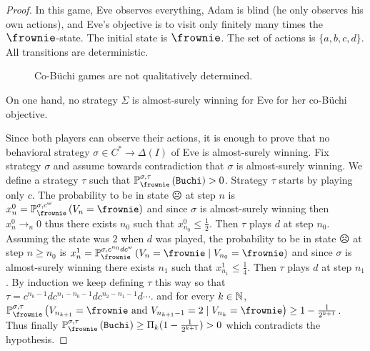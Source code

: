 \begin{proof}
In this game, Eve observes
everything, Adam is blind (he only observes his own actions),
and Eve's objective is to visit only finitely many times the ${\large \frownie}$-state. The initial state is $\large{\frownie}$. The set of actions is $\{a,b,c,d\}$.
All transitions are deterministic.%

\begin{figure}[h]
\begin{center}
\end{center}
\caption{Co-B{\"u}chi games are not qualitatively determined.}
\label{chap9fig4}
\end{figure} 


On one hand, no strategy $\Sigma$
is almost-surely winning for Eve
for her co-B{\"u}chi objective.
{
Since both players can observe their actions,
it is enough to prove that no behavioral
strategy
$\sigma\in C^*\to \Delta(I)$ of Eve is almost-surely winning.
Fix strategy $\sigma$ and assume towards contradiction that $\sigma$ is almost-surely winning. 
We define a strategy $\tau$
such that
$\probimp{\sigma,\tau}{\frownie}{ \winbuchi} > 0$.
Strategy $\tau$ starts by playing only $c$.
The probability to be in state $\frownie$ at step $n$ is
$x^{0}_n = \probimp{\sigma,c^\omega}{\frownie}{V_n=\frownie}$ and since $\sigma$ is almost-surely winning then $x^{0}_n \to_n 0$ thus there exists  $n_0$ such that 
$x^{0}_{n_0}\leq \frac{1}{2}$.
Then $\tau$ plays $d$ at step $n_0$.
Assuming the state was $2$ when $d$ was played, 
the probability to be in state $\frownie$ at step $n\geq n_0$ is
$x^{1}_n = \probimp{\sigma,c^{n_0}dc^\omega}{\frownie}{V_{n}=\frownie\mid V_{n_0}=\frownie}$
and since $\sigma$ is almost-surely winning there exists $n_1$ such that
$x^{1}_{n_1}\leq  \frac{1}{4}$.
Then $\tau$ plays $d$ at step $n_1$.
By induction we keep defining $\tau$ this way so that
$\tau=c^{n_0-1}d c^{n_1 - n_0 - 1}dc^{n_2 - n_1 - 1}d \cdots $.
and for every $k\in \mathbb{N}$,
$\probimp{\sigma,\tau}{\frownie}{
V_{n_{k+1}}=\frownie
\text{ and }
V_{n_{k+1}-1}=2
\mid 
V_{n_{k}}=\frownie
} \geq 1 - \frac{1}{2^{k+1}}$.
Thus finally
$\probimp{\sigma,\tau}{\frownie}{\winbuchi} \geq
\Pi_{k} (1 - \frac{1}{2^{k+1}})>0$ which contradicts the hypothesis.

}


\end{proof}
